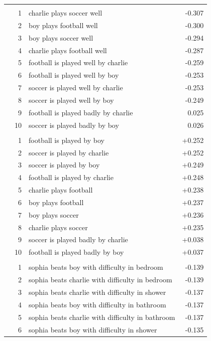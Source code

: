\begin{longtable}{@{}lrlr@{}}
\bottomrule
\endlastfoot
\multicolumn{4}{l}{\textit{Word -- Hardest}} \\
 & 1 & charlie plays soccer well & -0.307 \\
 & 2 & boy plays football well & -0.300 \\
 & 3 & boy plays soccer well & -0.294 \\
 & 4 & charlie plays football well & -0.287 \\
 & 5 & football is played well by charlie & -0.259 \\
 & 6 & football is played well by boy & -0.253 \\
 & 7 & soccer is played well by charlie & -0.253 \\
 & 8 & soccer is played well by boy & -0.249 \\
 & 9 & football is played badly by charlie & 0.025 \\
 & 10 & soccer is played badly by boy & 0.026 \\
\addlinespace[3pt]
\multicolumn{4}{l}{\textit{Word -- Easiest}} \\
 & 1 & football is played by boy & +0.252 \\
 & 2 & soccer is played by charlie & +0.252 \\
 & 3 & soccer is played by boy & +0.249 \\
 & 4 & football is played by charlie & +0.248 \\
 & 5 & charlie plays football & +0.238 \\
 & 6 & boy plays football & +0.237 \\
 & 7 & boy plays soccer & +0.236 \\
 & 8 & charlie plays soccer & +0.235 \\
 & 9 & soccer is played badly by charlie & +0.038 \\
 & 10 & football is played badly by boy & +0.037 \\
\addlinespace
\multicolumn{4}{l}{\textit{Sentence -- Hardest}} \\
 & 1 & sophia beats boy with difficulty in bedroom & -0.139 \\
 & 2 & sophia beats charlie with difficulty in bedroom & -0.139 \\
 & 3 & sophia beats charlie with difficulty in shower & -0.137 \\
 & 4 & sophia beats boy with difficulty in bathroom & -0.137 \\
 & 5 & sophia beats charlie with difficulty in bathroom & -0.137 \\
 & 6 & sophia beats boy with difficulty in shower & -0.135 \\

\end{longtable}
